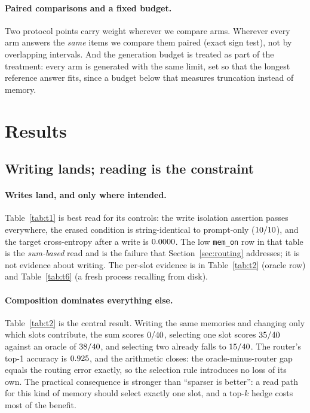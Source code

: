 \documentclass[11pt]{article}
\begin{document}
\paragraph{Paired comparisons and a fixed budget.} Two protocol points carry weight wherever
we compare arms. Wherever every arm answers the \emph{same} items we compare them paired (exact
sign test), not by overlapping intervals. And the generation budget is treated as part of the
treatment: every arm is generated with the same limit, set so that the longest reference answer
fits, since a budget below that measures truncation instead of memory.

\section{Results}
\label{sec:results}

\subsection{Writing lands; reading is the constraint}

\paragraph{Writes land, and only where intended.} Table~\ref{tab:t1} is best read
for its controls: the write isolation assertion passes
everywhere, the erased condition is string-identical to prompt-only
($10/10$), and the target cross-entropy after a write is
$0.0000$. The low \texttt{mem\_on} row in that table is the \emph{sum-based}
read and is the failure that Section~\ref{sec:routing} addresses; it is not
evidence about writing. The per-slot evidence is in Table~\ref{tab:t2} (oracle
row) and Table~\ref{tab:t6} (a fresh process recalling from disk).

\paragraph{Composition dominates everything else.} Table~\ref{tab:t2} is the
central result. Writing the same memories and changing only which slots
contribute, the sum scores $0/40{}$, selecting one slot scores $35/40{}$
against an oracle of $38/40{}$, and selecting two already falls to
$15/40{}$. The router's top-1 accuracy is $0.925{}$, and the arithmetic
closes: the oracle-minus-router gap equals the routing error exactly, so the
selection rule introduces no loss of its own. The practical consequence is
stronger than ``sparser is better'': a read path for this kind of memory should
select exactly one slot, and a top-$k$ hedge costs most of the benefit.
\end{document}
